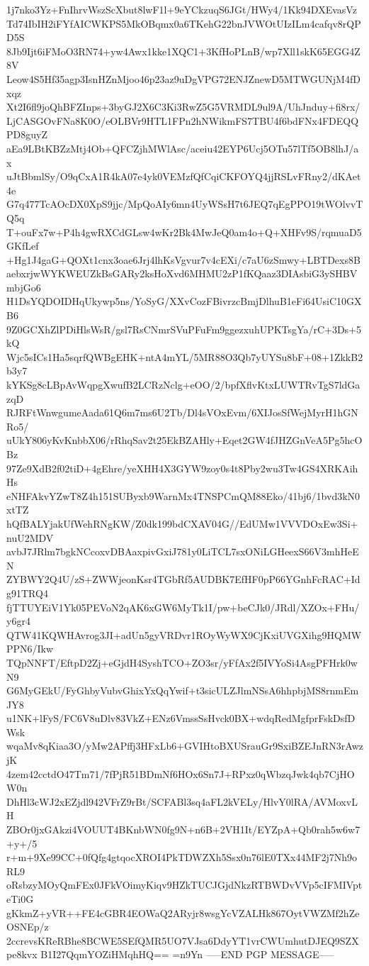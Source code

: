 1j7nko3Yz+FnIhrvWszScXbut8lwF1l+9eYCkzuqS6JGt/HWy4/1Kk94DXEvasVz
Td74IbIH2iFYfAICWKPS5MkOBqmx0a6TKehG22bnJVWOtUIzILm4cafqv8rQPD5S
8Jb9Ijt6iFMoO3RN74+yw4Awx1kke1XQC1+3KfHoPLnB/wp7Xll1skK65EGG4Z8V
Leow4S5Hf35agp3IsnHZnMjoo46p23az9uDgVPG72ENJZnewD5MTWGUNjM4fDxqz
Xt2I6fl9joQhBFZInps+3byGJ2X6C3Ki3RwZ5G5VRMDL9ul9A/UhJnduy+fi8rx/
LjCASGOvFNa8K0O/eOLBVr9HTL1FPn2hNWikmFS7TBU4f6bdFNx4FDEQQPD8guyZ
aEa9LBtKBZzMtj4Ob+QFCZjhMWlAsc/aceiu42EYP6Ucj5OTu57lTf5OB8lhJ/ax
uJtBbmlSy/O9qCxA1R4kA07e4yk0VEMzfQfCqiCKFOYQ4jjRSLvFRny2/dKAet4e
G7q477TcAOcDX0XpS9jjc/MpQoAIy6mn4UyWSsH7t6JEQ7qEgPPO19tWOlvvTQ5q
T+ouFx7w+P4h4gwRXCdGLsw4wKr2Bk4MwJeQ0am4o+Q+XHFv9S/rqmuaD5GKfLef
+Hg1J4gaG+QOXt1cnx3oae6Jrj4lhKsVgvur7v4cEXi/c7aU6zSmwy+LBTDexs8B
aebxrjwWYKWEUZkBsGARy2ksHoXvd6MHMU2zP1fKQaaz3DIAsbiG3ySHBVmbjGo6
H1DsYQDOIDHqUkywp5ns/YoSyG/XXvCozFBivrzcBmjDlhuB1eFi64UsiC10GXB6
9Z0GCXhZlPDiHlsWsR/gsl7RsCNmrSVuPFuFm9ggezxuhUPKTsgYa/rC+3Ds+5kQ
Wjc5sICs1Ha5sqrfQWBgEHK+ntA4mYL/5MR88O3Qb7yUYSu8bF+08+1ZkkB2b3y7
kYKSg8cLBpAvWqpgXwufB2LCRzNclg+eOO/2/bpfXflvKtxLUWTRvTgS7ldGazqD
RJRFtWnwgumeAada61Q6m7ms6U2Tb/Dl4sVOxEvm/6XIJosSfWejMyrH1hGNRo5/
uUkY806yKvKnbbX06/rRhqSav2t25EkBZAHly+Eqet2GW4fJHZGnVeA5Pg5hcOBz
97Ze9XdB2f02tiD+4gEhre/yeXHH4X3GYW9zoy0s4t8Pby2wu3Tw4GS4XRKAihHs
eNHFAkvYZwT8Z4h151SUByxb9WarnMx4TNSPCmQM88Eko/41bj6/1bvd3kN0xtTZ
hQfBALYjakUfWehRNgKW/Z0dk199bdCXAV04G//EdUMw1VVVDOxEw3Si+nuU2MDV
avbJ7JRlm7bgkNCcoxvDBAaxpivGxiJ781y0LiTCL7sxONiLGHeexS66V3mhHeEN
ZYBWY2Q4U/zS+ZWWjeonKsr4TGbRf5AUDBK7EfHF0pP66YGnhFcRAC+Idg91TRQ4
fjTTUYEiV1Yk05PEVoN2qAK6xGW6MyTk1I/pw+beCJk0/JRdl/XZOx+FHu/y6gr4
QTW41KQWHAvrog3JI+adUn5gyVRDvr1ROyWyWX9CjKxiUVGXihg9HQMWPPN6/Ikw
TQpNNFT/EftpD2Zj+eGjdH4SyshTCO+ZO3sr/yFfAx2f5IVYoSi4AsgPFHrk0wN9
G6MyGEkU/FyGhbyVubvGhixYxQqYwif+t3sicULZJlmNSsA6hhpbjMS8rnmEmJY8
u1NK+lFyS/FC6V8uDlv83VkZ+ENz6VmssSsHvck0BX+wdqRedMgfprFskDsfDWsk
wqaMv8qKiaa3O/yMw2APffj3HFxLb6+GVIHtoBXUSrauGr9SxiBZEJnRN3rAwzjK
4zem42cctdO47Tm71/7fPjR51BDmNf6HOx6Sn7J+RPxz0qWbzqJwk4qb7CjHOW0n
DhHl3cWJ2xEZjdl942VFrZ9rBt/SCFABl3sq4aFL2kVELy/HlvY0lRA/AVMoxvLH
ZBOr0jxGAkzi4VOUUT4BKnbWN0fg9N+n6B+2VH1It/EYZpA+Qb0rah5w6w7+y+/5
r+m+9Xe99CC+0fQfg4gtqocXROI4PkTDWZXh5Ssx0n76lE0TXx44MF2j7Nh9oRL9
oRsbzyMOyQmFEx0JFkVOimyKiqv9HZkTUCJGjdNkzRTBWDvVVp5cIFMIVpteTi0G
gKkmZ+yVR++FE4cGBR4EOWaQ2ARyjr8wsgYcVZALHk867OytVWZMf2hZeOSNEp/z
2ccrevsKReRBhe8BCWE5SEfQMR5UO7VJsa6DdyYT1vrCWUmhutDJEQ9SZXpe8kvx
B1I27QqmYOZiHMqhHQ==
=n9Yn
-----END PGP MESSAGE-----
